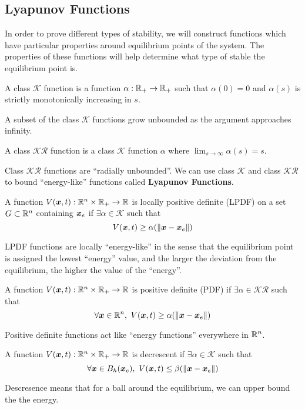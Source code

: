 \subsection{Lyapunov Functions}
In order to prove different types of stability, we will construct functions
which have particular properties around equilibrium points of the system. The
properties of these functions will help determine what type of stable the
equilibrium point is.
\begin{definition}
	A class $\mathcal{K}$ function is a function $\alpha: \mathbb{R}_+ \to \mathbb{R}_+$ such that
	$\alpha(0) = 0$ and $\alpha(s)$ is strictly monotonically increasing in $s$.
	\label{defn:class-k-function}
\end{definition}
A subset of the class $\mathcal{K}$ functions grow unbounded as the argument
approaches infinity.
\begin{definition}
	A class $\mathcal{KR}$ function is a class $\mathcal{K}$ function $\alpha$
	where $\lim_{s\to\infty}\alpha(s) = s$.
	\label{defn:class-kr-function}
\end{definition}
Class $\mathcal{KR}$ functions are ``radially unbounded''.
We can use class $\mathcal{K}$ and class $\mathcal{KR}$ to bound ``energy-like''
functions called \textbf{Lyapunov Functions}.
\begin{definition}
	A function $V(\boldsymbol{x}, t): \mathbb{R}^n \times \mathbb{R}_+ \to \mathbb{R}$ is locally positive
	definite (LPDF) on a set $G\subset \mathbb{R}^n$ containing $\boldsymbol{x}_e$ if $\exists
	\alpha \in \mathcal{K}$ such that \[
		V(\boldsymbol{x}, t) \geq \alpha(\|\boldsymbol{x} - \boldsymbol{x}_e\|)
	\]
	\label{defn:lpdf}
\end{definition}
LPDF functions are locally ``energy-like'' in the sense that the equilibrium
point is assigned the lowest ``energy'' value, and the larger the deviation from
the equilibrium, the higher the value of the ``energy''.
\begin{definition}
	A function $V(\boldsymbol{x}, t): \mathbb{R}^n \times \mathbb{R}_+ \to \mathbb{R}$ is positive
	definite (PDF) if $\exists
	\alpha \in \mathcal{KR}$ such that \[
		\forall \boldsymbol{x}\in\mathbb{R}^n,\ V(\boldsymbol{x}, t) \geq \alpha(\|\boldsymbol{x} - \boldsymbol{x}_e\|)
	\]
	\label{defn:pdf}
\end{definition}
Positive definite functions act like ``energy functions'' everywhere in $\mathbb{R}^n$.
\begin{definition}
	A function $V(\boldsymbol{x}, t): \mathbb{R}^n \times \mathbb{R}_+ \to \mathbb{R}$ is decrescent
	if $\exists
	\alpha \in \mathcal{K}$ such that \[
		\forall \boldsymbol{x}\in B_h(\boldsymbol{x}_e),\ V(\boldsymbol{x}, t) \leq \beta(\|\boldsymbol{x} - \boldsymbol{x}_e\|)
	\]
	\label{defn:decrescent}
\end{definition}
Descresence means that for a ball around the equilibrium, we can upper bound the
the energy.

